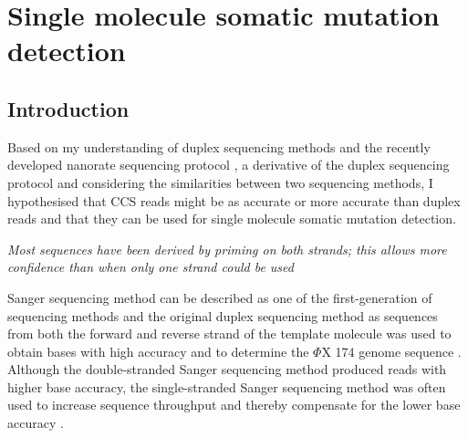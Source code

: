 
\chapter{Single molecule somatic mutation detection}

\ifpdf
    \graphicspath{{Chapter2/Figs/Raster/}{Chapter2/Figs/PDF/}{Chapter2/Figs/}}
\else
    \graphicspath{{Chapter2/Figs/Vector/}{Chapter2/Figs/}}
\fi

\section{Introduction}

Based on my understanding of duplex sequencing methods \cite{Schmitt2012-yr, Hoang2016-jx} and the recently developed nanorate sequencing protocol \cite{Abascal2021-pk}, a derivative of the duplex sequencing protocol and considering the similarities between two sequencing methods, I hypothesised that CCS reads might be as accurate or more accurate than duplex reads and that they can be used for single molecule somatic mutation detection. \newline

\textit{Most sequences have been derived by priming on both strands; this allows more confidence than when only one strand could be used} \cite{}
\begin{flushright}  \end{flushright}

Sanger sequencing method can be described as one of the first-generation of sequencing methods and the original duplex sequencing method as sequences from both the forward and reverse strand of the template molecule was used to obtain bases with high accuracy and to determine the $\Phi$X 174 genome sequence \cite{}. Although the double-stranded Sanger sequencing method produced reads with higher base accuracy, the single-stranded Sanger sequencing method was often used to increase sequence throughput and thereby compensate for the lower base accuracy \cite{}.

